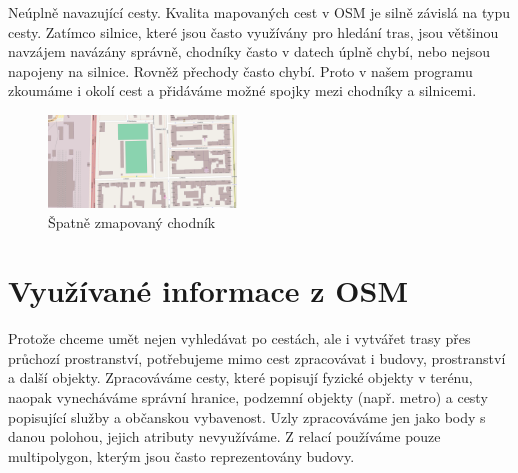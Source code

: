 {\tuc Neúplně navazující cesty.} Kvalita mapovaných cest v OSM je silně závislá na typu
cesty. Zatímco silnice, které jsou často využívány pro hledání tras, jsou
většinou navzájem navázány správně, chodníky často v datech úplně chybí, nebo
nejsou napojeny na silnice. Rovněž přechody často chybí. Proto v našem programu
zkoumáme i okolí cest a přidáváme možné spojky mezi chodníky a silnicemi.
\begin{figure}
	\centering
	\includegraphics[width=50mm]{../img/chodnik.pdf}
	\caption{Špatně zmapovaný chodník}
	\label{fig:chodnik}
\end{figure}

\section{Využívané informace z OSM}
Protože chceme umět nejen vyhledávat po cestách, ale i vytvářet trasy přes
průchozí prostranství, potřebujeme mimo cest zpracovávat i budovy, prostranství 
a další objekty. Zpracováváme cesty, které popisují fyzické objekty v terénu,
naopak vynecháváme správní hranice, podzemní objekty (např. metro) a cesty
popisující služby a občanskou vybavenost. Uzly zpracováváme jen jako body s
danou polohou, jejich atributy nevyužíváme. Z relací používáme pouze
multipolygon, kterým jsou často reprezentovány budovy.


